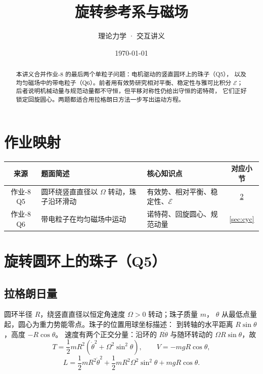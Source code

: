 \documentclass[UTF8,a4paper,11pt]{ctexart}
\title{\textbf{旋转参考系与磁场}}
\author{理论力学 · 交互讲义}
\date{\today}
\begin{document}
\maketitle

\begin{abstract}
本讲义合并作业-8 的最后两个单粒子问题：电机驱动的竖直圆环上的珠子（Q5），
以及均匀磁场中的带电粒子（Q6）。前者用有效势研究相对平衡、稳定性与雅可比积分
$\mathcal E$；后者说明机械动量与规范动量都不守恒，但平移对称性仍给出守恒的诺特荷，
它们正好锁定回旋圆心。两题都适合用拉格朗日方法一步写出运动方程。
\end{abstract}

\tableofcontents
\newpage

\section{作业映射}

\begin{center}
\small
\begin{tabular}{cp{5.9cm}p{3.2cm}c}
\toprule
来源 & 题面简述 & 核心知识点 & 对应小节 \\
\midrule
作业-8 Q5 & 圆环绕竖直直径以 $\Omega$ 转动，珠子沿环滑动 &
  有效势、相对平衡、稳定性、$\mathcal E$ & \ref{sec:ring} \\
作业-8 Q6 & 带电粒子在均匀磁场中运动 &
  诺特荷、回旋圆心、规范动量 & \ref{sec:cyc} \\
\bottomrule
\end{tabular}
\end{center}

\section{旋转圆环上的珠子（Q5）}\label{sec:ring}

\subsection{拉格朗日量}

圆环半径 $R$，绕竖直直径以恒定角速度 $\Omega>0$ 转动；珠子质量 $m$，
$\theta$ 从最低点量起，圆心为重力势能零点。珠子的位置用球坐标描述：
到转轴的水平距离 $R\sin\theta$，高度 $-R\cos\theta$。
速度有两个正交分量：沿环的 $R\dot\theta$ 与随环转动的 $\Omega R\sin\theta$，故
\begin{equation}
  T=\frac12mR^2\left(\dot\theta^2+\Omega^2\sin^2\theta\right),
  \qquad
  V=-mgR\cos\theta,
  \label{eq:r-TV}
\end{equation}
\begin{equation}
  L=\frac12mR^2\dot\theta^2+\frac12mR^2\Omega^2\sin^2\theta+mgR\cos\theta .
  \label{eq:r-L}
\end{equation}
\end{document}
